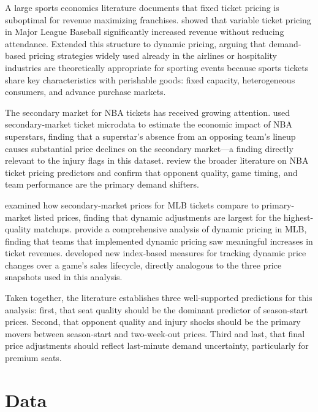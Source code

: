 \documentclass[12pt]{article}
\begin{document}
A large sports economics literature documents that fixed ticket pricing is suboptimal for revenue maximizing franchises.  \citet{rascher2007variable} showed that variable ticket pricing in Major League Baseball significantly increased revenue without reducing attendance. \citet{drayer2012dynamic} Extended this structure to dynamic pricing, arguing that demand-based pricing strategies widely used already in the airlines or hospitality industries are theoretically appropriate for sporting events because sports tickets share key characteristics with perishable goods: fixed capacity, heterogeneous consumers, and advance purchase markets.
 
The secondary market for NBA tickets has received growing attention. \citet{Kaplan2019} used secondary-market ticket microdata to estimate the economic impact of NBA superstars, finding that a superstar's absence from an opposing team's lineup causes substantial price declines on the secondary market---a finding directly relevant to the injury flags in this dataset. \citet{wanghan2023variables} review the broader literature on NBA ticket pricing predictors and confirm that opponent quality, game timing, and team performance are the primary demand shifters.
 
\citet{shapiro2012newage} examined how secondary-market prices for MLB tickets compare to primary-market listed prices, finding that dynamic adjustments are largest for the highest-quality matchups. \citet{courty2020variable} provide a comprehensive analysis of dynamic pricing in MLB, finding that teams that implemented dynamic pricing saw meaningful increases in ticket revenues. \citet{patel2018indices} developed new index-based measures for tracking dynamic price changes over a game's sales lifecycle, directly analogous to the three price snapshots used in this analysis.
 
Taken together, the literature establishes three well-supported predictions for this analysis: first, that seat quality should be the dominant predictor of season-start prices. Second, that opponent quality and injury shocks should be the primary movers between season-start and two-week-out prices. Third and last, that final price adjustments should reflect last-minute demand uncertainty, particularly for premium seats.
 
 
\section{Data}
\label{sec:data}
 
\end{document}
